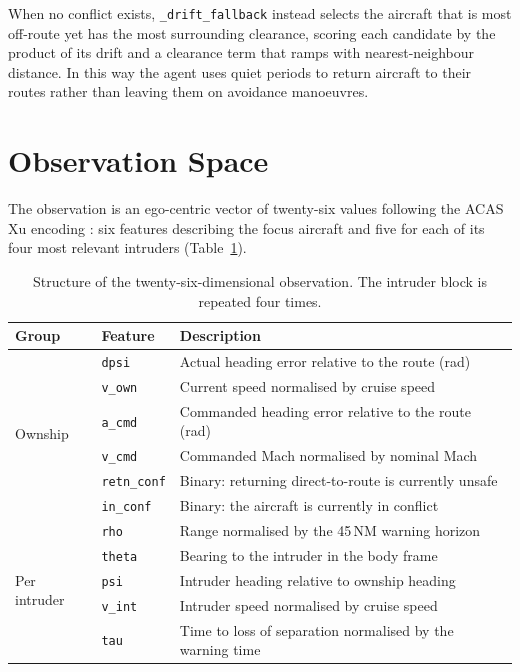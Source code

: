 When no conflict exists, \texttt{\_drift\_fallback} instead selects the aircraft that is most off-route yet has the most surrounding clearance, scoring each candidate by the product of its drift and a clearance term that ramps with nearest-neighbour distance. In this way the agent uses quiet periods to return aircraft to their routes rather than leaving them on avoidance manoeuvres.


\section{Observation Space}
\label{sec:method_obs}

The observation is an ego-centric vector of twenty-six values following the ACAS Xu encoding \cite{Julian_2019, kochenderfer2011robust}: six features describing the focus aircraft and five for each of its four most relevant intruders (Table~\ref{tab:obs}).

\begin{table}[htbp]
\centering
\caption{Structure of the twenty-six-dimensional observation. The intruder block is repeated four times.}
\label{tab:obs}
\begin{tabular}{llp{7.6cm}}
\toprule
Group & Feature & Description \\
\midrule
\multirow{6}{*}{Ownship}
 & \texttt{dpsi}       & Actual heading error relative to the route (rad) \\
 & \texttt{v\_own}     & Current speed normalised by cruise speed \\
 & \texttt{a\_cmd}     & Commanded heading error relative to the route (rad) \\
 & \texttt{v\_cmd}     & Commanded Mach normalised by nominal Mach \\
 & \texttt{retn\_conf} & Binary: returning direct-to-route is currently unsafe \\
 & \texttt{in\_conf}   & Binary: the aircraft is currently in conflict \\
\midrule
\multirow{5}{*}{Per intruder}
 & \texttt{rho}    & Range normalised by the 45\,NM warning horizon \\
 & \texttt{theta}  & Bearing to the intruder in the body frame \\
 & \texttt{psi}    & Intruder heading relative to ownship heading \\
 & \texttt{v\_int} & Intruder speed normalised by cruise speed \\
 & \texttt{tau}    & Time to loss of separation normalised by the warning time \\
\bottomrule
\end{tabular}
\end{table}

